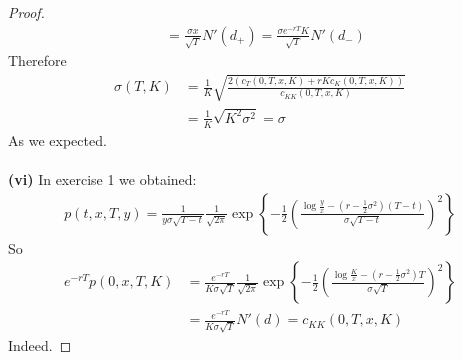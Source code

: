 \documentclass[a4paper, 10pt]{article}
\theoremstyle{definition}
\theoremstyle{hSol}
\begin{document}
\begin{proof}
\begin{equation}
\begin{split}
    &=\frac{\sigma x}{\sqrt{T}} N'(d_+) = \frac{\sigma e^{-rT}K}{\sqrt{T}} N'(d_-)
  \end{split}
\end{equation}
Therefore
\begin{equation}
  \begin{split}
    \sigma(T,K) &= \frac{1}{K}\sqrt{\frac{2(c_T(0,T,x,K) + rKc_K(0,T,x,K))}{c_{KK}(0,T,x,K)}} \\
    &= \frac{1}{K}\sqrt{K^2\sigma^2} = \sigma
  \end{split}
\end{equation}
As we expected.\\
~\\
\textbf{(vi)} In exercise 1 we obtained:
\begin{equation}
  \begin{split}
    p(t,x,T,y) =\frac{1}{y\sigma \sqrt{T-t}} \frac{1}{\sqrt{2\pi}} \exp\left\{-\frac{1}{2}\left(\frac{\log \frac{y}{x} -(r-\frac{1}{2}\sigma^2)(T-t)}{\sigma \sqrt{T-t}}\right)^2\right\}
  \end{split}
\end{equation}
So
\begin{equation}
  \begin{split}
    e^{-rT}p(0,x,T,K) &= \frac{e^{-rT}}{K\sigma \sqrt{T}} \frac{1}{\sqrt{2\pi}} \exp\left\{-\frac{1}{2}\left(\frac{\log \frac{K}{x} -(r-\frac{1}{2}\sigma^2)T}{\sigma \sqrt{T}}\right)^2\right\}\\
    &= \frac{e^{-rT}}{K\sigma \sqrt{T}} N'(d) = c_{KK}(0,T,x,K)
  \end{split}
\end{equation}
Indeed.
\end{proof}
\end{document}
